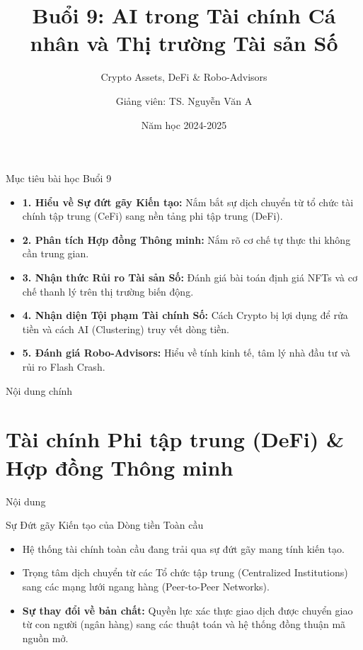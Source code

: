 \documentclass[aspectratio=169, 12pt]{beamer}
\title[Buổi 9: AI \& Tài sản Số]{Buổi 9: AI trong Tài chính Cá nhân và Thị trường Tài sản Số}
\subtitle{Crypto Assets, DeFi \& Robo-Advisors}
\author[Giảng viên]{Giảng viên: TS. Nguyễn Văn A}
\institute[Đông Á]{Đại học Đông Á}
\date{Năm học 2024-2025}
\begin{document}
\begin{frame}
    \titlepage
\end{frame}

\begin{frame}{Mục tiêu bài học Buổi 9}
    \begin{itemize}
        \item \textbf{1. Hiểu về Sự đứt gãy Kiến tạo:} Nắm bắt sự dịch chuyển từ tổ chức tài chính tập trung (CeFi) sang nền tảng phi tập trung (DeFi).
        \item \textbf{2. Phân tích Hợp đồng Thông minh:} Nắm rõ cơ chế tự thực thi không cần trung gian.
        \item \textbf{3. Nhận thức Rủi ro Tài sản Số:} Đánh giá bài toán định giá NFTs và cơ chế thanh lý trên thị trường biến động.
        \item \textbf{4. Nhận diện Tội phạm Tài chính Số:} Cách Crypto bị lợi dụng để rửa tiền và cách AI (Clustering) truy vết dòng tiền.
        \item \textbf{5. Đánh giá Robo-Advisors:} Hiểu về tính kinh tế, tâm lý nhà đầu tư và rủi ro Flash Crash.
    \end{itemize}
\end{frame}

\begin{frame}{Nội dung chính}
    \tableofcontents
\end{frame}

\section{Tài chính Phi tập trung (DeFi) \& Hợp đồng Thông minh}

\begin{frame}{Nội dung}
    \tableofcontents[currentsection]
\end{frame}

\begin{frame}{Sự Đứt gãy Kiến tạo của Dòng tiền Toàn cầu}
    \begin{itemize}
        \item Hệ thống tài chính toàn cầu đang trải qua sự đứt gãy mang tính kiến tạo.
        \item Trọng tâm dịch chuyển từ các Tổ chức tập trung (Centralized Institutions) sang các mạng lưới ngang hàng (Peer-to-Peer Networks).
        \item \textbf{Sự thay đổi về bản chất:} Quyền lực xác thực giao dịch được chuyển giao từ con người (ngân hàng) sang các thuật toán và hệ thống đồng thuận mã nguồn mở.
    \end{itemize}
\end{frame}
\end{document}
